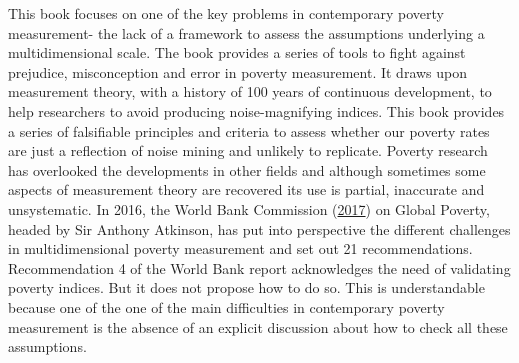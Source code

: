 \documentclass[]{book}
\begin{document}
This book focuses on one of the key problems in contemporary poverty measurement- the lack of a framework to assess the assumptions underlying a multidimensional scale. The book provides a series of tools to fight against prejudice, misconception and error in poverty measurement. It draws upon measurement theory, with a history of 100 years of continuous development, to help researchers to avoid producing noise-magnifying indices. This book provides a series of falsifiable principles and criteria to assess whether our poverty rates are just a reflection of noise mining and unlikely to replicate. Poverty research has overlooked the developments in other fields and although sometimes some aspects of measurement theory are recovered its use is partial, inaccurate and unsystematic. In 2016, the World Bank Commission (\protect\hyperlink{ref-Bank2017}{2017}) on Global Poverty, headed by Sir Anthony Atkinson, has put into perspective the different challenges in multidimensional poverty measurement and set out 21 recommendations. Recommendation 4 of the World Bank report acknowledges the need of validating poverty indices. But it does not propose how to do so. This is understandable because one of the one of the main difficulties in contemporary poverty measurement is the absence of an explicit discussion about how to check all these assumptions.
\end{document}
